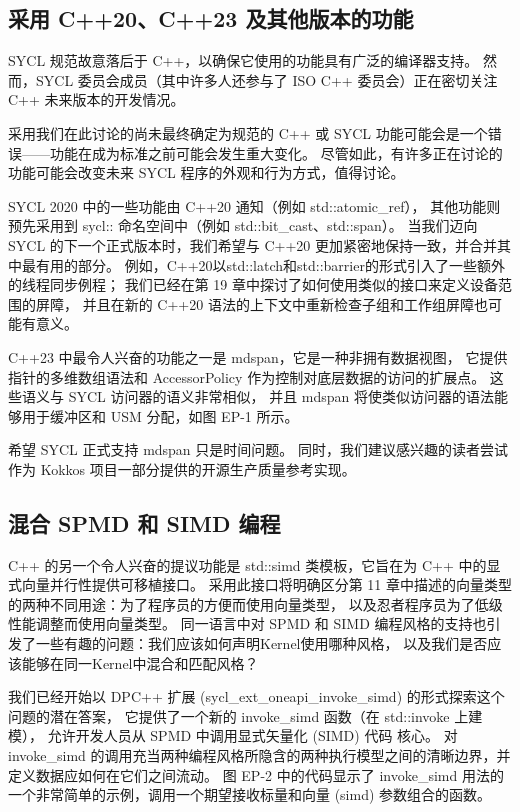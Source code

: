 \subsection{采用 C++20、C++23 及其他版本的功能}
SYCL 规范故意落后于 C++，以确保它使用的功能具有广泛的编译器支持。 
然而，SYCL 委员会成员（其中许多人还参与了 ISO C++ 委员会）正在密切关注 C++ 未来版本的开发情况。

采用我们在此讨论的尚未最终确定为规范的 C++ 或 SYCL 功能可能会是一个错误——功能在成为标准之前可能会发生重大变化。 
尽管如此，有许多正在讨论的功能可能会改变未来 SYCL 程序的外观和行为方式，值得讨论。

SYCL 2020 中的一些功能由 C++20 通知（例如 std::atomic\_ref），
其他功能则预先采用到 sycl:: 命名空间中（例如 std::bit\_cast、std::span）。 
当我们迈向 SYCL 的下一个正式版本时，我们希望与 C++20 更加紧密地保持一致，并合并其中最有用的部分。 
例如，C++20以std::latch和std::barrier的形式引入了一些额外的线程同步例程； 
我们已经在第 19 章中探讨了如何使用类似的接口来定义设备范围的屏障，
并且在新的 C++20 语法的上下文中重新检查子组和工作组屏障也可能有意义。

C++23 中最令人兴奋的功能之一是 mdspan，它是一种非拥有数据视图，
它提供指针的多维数组语法和 AccessorPolicy 作为控制对底层数据的访问的扩展点。 
这些语义与 SYCL 访问器的语义非常相似，
并且 mdspan 将使类似访问器的语法能够用于缓冲区和 USM 分配，如图 EP-1 所示。

希望 SYCL 正式支持 mdspan 只是时间问题。 
同时，我们建议感兴趣的读者尝试作为 Kokkos 项目一部分提供的开源生产质量参考实现。

\subsection{混合 SPMD 和 SIMD 编程}
C++ 的另一个令人兴奋的提议功能是 std::simd 类模板，它旨在为 C++ 中的显式向量并行性提供可移植接口。 
采用此接口将明确区分第 11 章中描述的向量类型的两种不同用途：为了程序员的方便而使用向量类型，
以及忍者程序员为了低级性能调整而使用向量类型。 
同一语言中对 SPMD 和 SIMD 编程风格的支持也引发了一些有趣的问题：我们应该如何声明Kernel使用哪种风格，
以及我们是否应该能够在同一Kernel中混合和匹配风格？

我们已经开始以 DPC++ 扩展 (sycl\_ext\_oneapi\_invoke\_simd) 的形式探索这个问题的潜在答案，
它提供了一个新的 invoke\_simd 函数（在 std::invoke 上建模），
允许开发人员从 SPMD 中调用显式矢量化 (SIMD) 代码 核心。 
对invoke\_simd 的调用充当两种编程风格所隐含的两种执行模型之间的清晰边界，并定义数据应如何在它们之间流动。 
图 EP-2 中的代码显示了 invoke\_simd 用法的一个非常简单的示例，调用一个期望接收标量和向量 (simd) 参数组合的函数。

